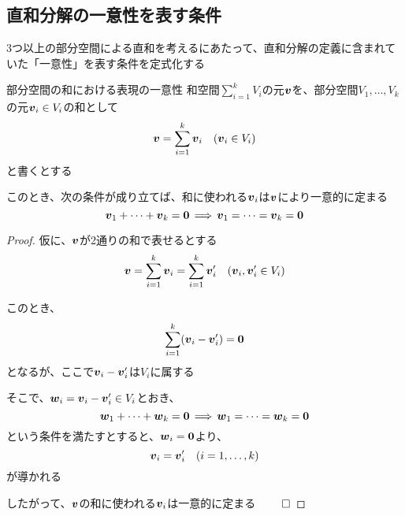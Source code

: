 \documentclass[../../../topic_linear-algebra]{subfiles}
\begin{document}
\subsection{直和分解の一意性を表す条件}

3つ以上の部分空間による直和を考えるにあたって、直和分解の定義に含まれていた「一意性」を表す条件を定式化する

\begin{theorem*}{部分空間の和における表現の一意性}
  和空間$\sum_{i=1}^k V_i$の元$\vb*{v}$を、部分空間$V_1, \ldots, V_k$の元$\vb*{v}_i \in V_i$の和として
  \begin{equation*}
    \vb*{v} = \sum_{i=1}^k \vb*{v}_i \quad (\vb*{v}_i \in V_i)
  \end{equation*}
  と書くとする

  このとき、次の条件が成り立てば、和に使われる$\vb*{v}_i$は$\vb*{v}$により一意的に定まる
  \begin{equation*}
    \vb*{v}_1 + \cdots + \vb*{v}_k = \vb*{0} \, \Longrightarrow \, \vb*{v}_1 = \cdots = \vb*{v}_k = \vb*{0}
  \end{equation*}
\end{theorem*}

\begin{proof}
  仮に、$\vb*{v}$が2通りの和で表せるとする
  \begin{equation*}
    \vb*{v} = \sum_{i=1}^k \vb*{v}_i = \sum_{i=1}^k \vb*{v}_i' \quad (\vb*{v}_i, \vb*{v}_i' \in V_i)
  \end{equation*}

  このとき、
  \begin{equation*}
    \sum_{i=1}^k (\vb*{v}_i - \vb*{v}_i') = \vb*{0}
  \end{equation*}
  となるが、ここで$\vb*{v}_i - \vb*{v}_i'$は$V_i$に属する

  \br

  そこで、$\vb*{w}_i = \vb*{v}_i - \vb*{v}_i' \in V_i$とおき、
  \begin{equation*}
    \vb*{w}_1 + \cdots + \vb*{w}_k = \vb*{0} \, \Longrightarrow \, \vb*{w}_1 = \cdots = \vb*{w}_k = \vb*{0}
  \end{equation*}
  という条件を満たすとすると、$\vb*{w}_i = \vb*{0}$より、
  \begin{equation*}
    \vb*{v}_i = \vb*{v}_i' \quad (i=1,\ldots,k)
  \end{equation*}
  が導かれる

  したがって、$\vb*{v}$の和に使われる$\vb*{v}_i$は一意的に定まる $\qed$
\end{proof}
\end{document}
